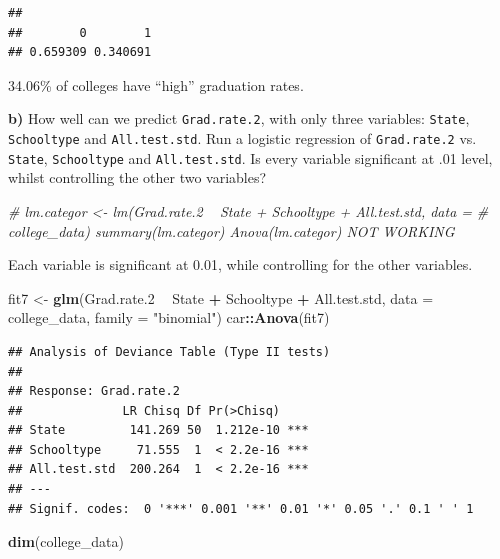 \documentclass[]{article}
\newenvironment{Shaded}{\begin{snugshade}}{\end{snugshade}}
\newcommand{\KeywordTok}[1]{\textcolor[rgb]{0.13,0.29,0.53}{\textbf{#1}}}
\newcommand{\DataTypeTok}[1]{\textcolor[rgb]{0.13,0.29,0.53}{#1}}
\newcommand{\DecValTok}[1]{\textcolor[rgb]{0.00,0.00,0.81}{#1}}
\newcommand{\StringTok}[1]{\textcolor[rgb]{0.31,0.60,0.02}{#1}}
\newcommand{\CommentTok}[1]{\textcolor[rgb]{0.56,0.35,0.01}{\textit{#1}}}
\newcommand{\OperatorTok}[1]{\textcolor[rgb]{0.81,0.36,0.00}{\textbf{#1}}}
\newcommand{\NormalTok}[1]{#1}
\begin{document}
\begin{verbatim}
## 
##        0        1 
## 0.659309 0.340691
\end{verbatim}

34.06\% of colleges have ``high'' graduation rates.

\textbf{b)} How well can we predict \texttt{Grad.rate.2}, with only
three variables: \texttt{State}, \texttt{Schooltype} and
\texttt{All.test.std}. Run a logistic regression of \texttt{Grad.rate.2}
vs. \texttt{State}, \texttt{Schooltype} and \texttt{All.test.std}. Is
every variable significant at .01 level, whilst controlling the other
two variables?

\begin{Shaded}
\begin{Highlighting}[]
\CommentTok{# lm.categor <- lm(Grad.rate.2 ~ State + Schooltype + All.test.std, data =}
\CommentTok{# college_data) summary(lm.categor) Anova(lm.categor) NOT WORKING}
\end{Highlighting}
\end{Shaded}

Each variable is significant at 0.01, while controlling for the other
variables.

\begin{Shaded}
\begin{Highlighting}[]
\NormalTok{fit7 <-}\StringTok{ }\KeywordTok{glm}\NormalTok{(Grad.rate.}\DecValTok{2} \OperatorTok{~}\StringTok{ }\NormalTok{State }\OperatorTok{+}\StringTok{ }\NormalTok{Schooltype }\OperatorTok{+}\StringTok{ }\NormalTok{All.test.std, }\DataTypeTok{data =}\NormalTok{ college_data, }
    \DataTypeTok{family =} \StringTok{"binomial"}\NormalTok{)}
\NormalTok{car}\OperatorTok{::}\KeywordTok{Anova}\NormalTok{(fit7)}
\end{Highlighting}
\end{Shaded}

\begin{verbatim}
## Analysis of Deviance Table (Type II tests)
## 
## Response: Grad.rate.2
##              LR Chisq Df Pr(>Chisq)    
## State         141.269 50  1.212e-10 ***
## Schooltype     71.555  1  < 2.2e-16 ***
## All.test.std  200.264  1  < 2.2e-16 ***
## ---
## Signif. codes:  0 '***' 0.001 '**' 0.01 '*' 0.05 '.' 0.1 ' ' 1
\end{verbatim}

\begin{Shaded}
\begin{Highlighting}[]
\KeywordTok{dim}\NormalTok{(college_data)}
\end{Highlighting}
\end{Shaded}
\end{document}
